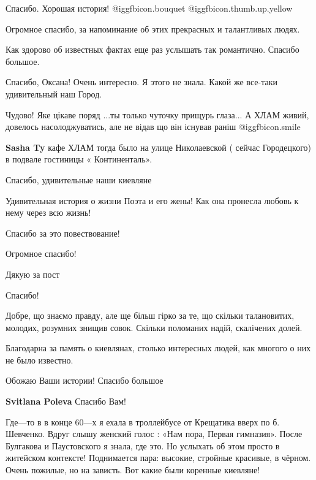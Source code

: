 \begin{itemize}
Спасибо. Хорошая история! @igg{fbicon.bouquet}  @igg{fbicon.thumb.up.yellow} 

Огромное спасибо, за напоминание об этих прекрасных и талантливых людях.

Как здорово об известных фактах еще раз услышать так романтично. Спасибо большое.

Спасибо, Оксана! Очень интересно. Я этого не знала. Какой же все-таки удивительный наш Город.

Чудово!
Яке цікаве поряд
...ты только чуточку прищурь глаза...
А ХЛАМ живий, довелось насолоджуватись, але не відав що він існував раніш
 @igg{fbicon.smile} 

\begin{itemize} %
\textbf{Sasha Ty} кафе ХЛАМ тогда было на улице Николаевской ( сейчас Городецкого) в подвале гостиницы « Континенталь».
\end{itemize} %

Спасибо, удивительные наши киевляне

Удивительная история о жизни Поэта и его жены! Как она пронесла любовь к нему через всю жизнь!

Спасибо за это повествование!

Огромное спасибо!

Дякую за пост

Спасибо!


Добре, що знаємо правду, але ще більш гірко за те, що скільки талановитих,
молодих, розумних знищив совок. Скільки поломаних надій, скалічених долей.


Благодарна за память о киевлянах, столько интересных людей, как многого о них не было известно.

Обожаю Ваши истории! Спасибо большое

\textbf{Svitlana Poleva} Спасибо Вам!


Где—то в в конце 60—х я ехала в троллейбусе от Крещатика вверх по б. Шевченко.
Вдруг слышу женский голос : «Нам пора, Первая гимназия». После Булгакова и
Паустовского я знала, где это. Но услыхать об этом просто в житейском
контексте! Поднимается пара: высокие, стройные красивые, в чёрном. Очень
пожилые, но на зависть. Вот какие были коренные киевляне!


\end{itemize}

